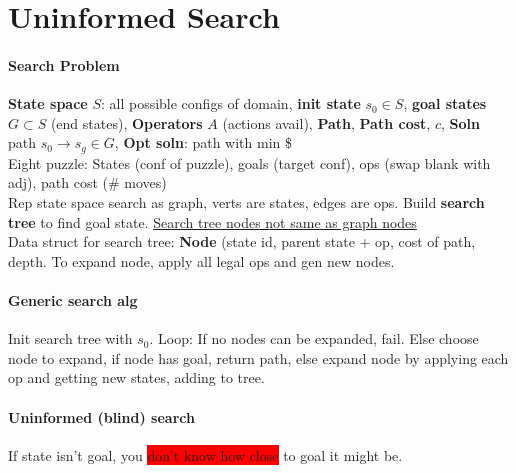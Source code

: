 \color[HTML]{11114E}
\section{Uninformed Search}
\paragraph{Search Problem} \textbf{State space} $S$: all possible configs of
domain, \textbf{init state} $s_0 \in S$, \textbf{goal
states} $G \subset S$ (end states), \textbf{Operators} $A$ (actions
avail), \textbf{Path}, \textbf{Path cost}, $c$, \textbf{Soln} path
$s_0 \to s_g\in G$, \textbf{Opt
  soln}: path with min \$
\\ Eight puzzle: States (conf of puzzle), goals (target conf), ops
(swap blank with adj), path cost (\# moves)
\\ Rep state space search as graph, verts are states, edges
are ops. Build \textbf{search tree} to find goal
state. \underline{Search tree nodes not same as graph nodes}
\\ Data struct for search tree: \textbf{Node} (state id, parent state
+ op, cost of path, depth. To expand node, apply all legal ops and gen
new nodes.
\paragraph{Generic search alg} Init search tree with $s_0$. Loop: If
no nodes can be expanded, fail. Else choose node to expand, if node
has goal, return path, else expand node by applying each op and
getting new states, adding to tree.
\paragraph{Uninformed (blind) search} If state isn't goal, you
\colorbox{red}{don't
know how close} to goal it might be.
